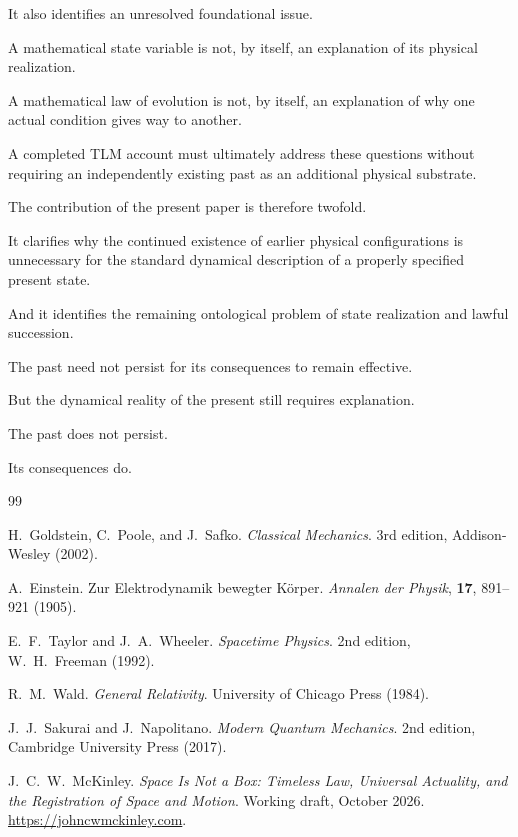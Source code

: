 \documentclass[12pt,onecolumn]{article}
\begin{document}
It also identifies an unresolved foundational issue.

A mathematical state variable is not, by itself, an explanation of its physical realization.

A mathematical law of evolution is not, by itself, an explanation of why one actual condition gives way to another.

A completed TLM account must ultimately address these questions without requiring an independently existing past as an additional physical substrate.

The contribution of the present paper is therefore twofold.

It clarifies why the continued existence of earlier physical configurations is unnecessary for the standard dynamical description of a properly specified present state.

And it identifies the remaining ontological problem of state realization and lawful succession.

The past need not persist for its consequences to remain effective.

But the dynamical reality of the present still requires explanation.

The past does not persist.

Its consequences do.


\begin{thebibliography}{99}

H.~Goldstein, C.~Poole, and J.~Safko.
\newblock \emph{Classical Mechanics}.
\newblock 3rd edition,
Addison-Wesley (2002).

A.~Einstein.
\newblock Zur Elektrodynamik bewegter K{\"o}rper.
\newblock \emph{Annalen der Physik},
\textbf{17}, 891--921 (1905).

E.~F.~Taylor and J.~A.~Wheeler.
\newblock \emph{Spacetime Physics}.
\newblock 2nd edition,
W.~H.~Freeman (1992).

R.~M.~Wald.
\newblock \emph{General Relativity}.
\newblock University of Chicago Press (1984).

J.~J.~Sakurai and J.~Napolitano.
\newblock \emph{Modern Quantum Mechanics}.
\newblock 2nd edition,
Cambridge University Press (2017).

J.~C.~W.~McKinley.
\newblock \emph{Space Is Not a Box:
Timeless Law, Universal Actuality,
and the Registration of Space and Motion}.
\newblock Working draft, October 2026.
\newblock \url{https://johncwmckinley.com}.

\end{thebibliography}
\end{document}
